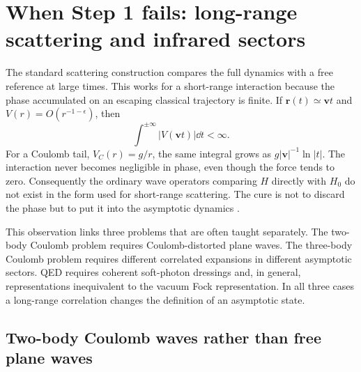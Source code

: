 \section{When Step 1 fails: long-range scattering and infrared sectors}
\label{sec:long-range-ir}

The standard scattering construction compares the full dynamics with a free
reference at large times.  This works for a short-range interaction because
the phase accumulated on an escaping classical trajectory is finite.  If
$\bm r(t)\simeq\bm v t$ and $V(r)=O(r^{-1-\epsilon})$, then
\begin{equation}
  \int^{\pm\infty}\lvert V(\bm v t)\rvert\dd t<\infty .
  \label{eq:short-range-trajectory-integral}
\end{equation}
For a Coulomb tail, $V_C(r)=g/r$, the same integral grows as
$g\lvert\bm v\rvert^{-1}\ln|t|$.  The interaction never becomes negligible
in phase, even though the force tends to zero.  Consequently the ordinary
wave operators comparing $H$ directly with $H_0$ do not exist in the form
used for short-range scattering.  The cure is not to discard the phase but to
put it into the asymptotic dynamics \cite{Dollard:1964,Dollard:1971,
DerezinskiGerard:1997}.

This observation links three problems that are often taught separately.  The
two-body Coulomb problem requires Coulomb-distorted plane waves.  The
three-body Coulomb problem requires different correlated expansions in
different asymptotic sectors.  QED requires coherent soft-photon dressings and,
in general, representations inequivalent to the vacuum Fock representation.
In all three cases a long-range correlation changes the definition of an
asymptotic state.

\subsection{Two-body Coulomb waves rather than free plane waves}
\label{subsec:two-body-coulomb}

